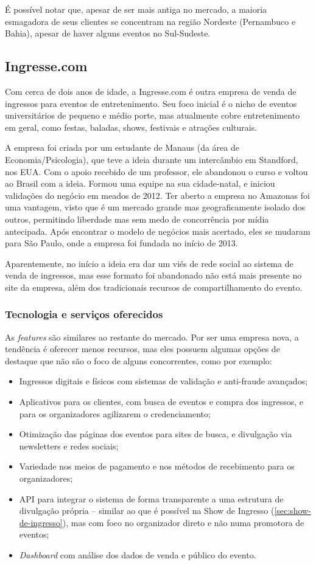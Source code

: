 \documentclass[12pt,a4paper,twoside,hyphens,english,brazil]{abntex2}
\begin{document}
É possível notar que, apesar de ser mais antiga no mercado, a maioria esmagadora de seus clientes se concentram na região Nordeste (Pernambuco e Bahia), apesar de haver alguns eventos no Sul-Sudeste.

\subsection{Ingresse.com}
Com cerca de dois anos de idade, a Ingresse.com é outra empresa de venda de ingressos para eventos de entretenimento. Seu foco inicial é o nicho de eventos universitários de pequeno e médio porte, mas atualmente cobre entretenimento em geral, como festas, baladas, shows, festivais e atrações culturais.

A empresa foi criada por um estudante de Manaus (da área de Economia/Psicologia), que teve a ideia durante um intercâmbio em Standford, nos EUA. Com o apoio recebido de um professor, ele abandonou o curso e voltou ao Brasil com a ideia. Formou uma equipe na sua cidade-natal, e iniciou validações do negócio em meados de 2012. Ter aberto a empresa no Amazonas foi uma vantagem, visto que é um mercado grande mas geograficamente isolado dos outros, permitindo liberdade mas sem medo de concorrência por mídia antecipada. Após encontrar o modelo de negócios mais acertado, eles se mudaram para São Paulo, onde a empresa foi fundada no início de 2013.\cite{ingresse-hypeness}\cite{ingresse-ig}

Aparentemente, no início a ideia era dar um viés de rede social ao sistema de venda de ingressos, mas esse formato foi abandonado não está mais presente no site da empresa, além dos tradicionais recursos de compartilhamento do evento.\cite{ingresse-ig}

\subsubsection*{Tecnologia e serviços oferecidos}
As \emph{features} são similares ao restante do mercado. Por ser uma empresa nova, a tendência é oferecer menos recursos, mas eles possuem algumas opções de destaque que não são o foco de alguns concorrentes, como por exemplo:
\begin{itemize}[itemsep=-1ex]
	\item Ingressos digitais e físicos com sistemas de validação e anti-fraude avançados;
	\item Aplicativos para os clientes, com busca de eventos e compra dos ingressos, e para os organizadores agilizarem o credenciamento;
	\item Otimização das páginas dos eventos para sites de busca, e divulgação via newsletters e redes sociais;
	\item Variedade nos meios de pagamento e nos métodos de recebimento para os organizadores;
	\item API para integrar o sistema de forma transparente a uma estrutura de divulgação própria -- similar ao que é possível na Show de Ingresso (\autoref{sec:show-de-ingresso}), mas com foco no organizador direto e não numa promotora de eventos;
	\item \emph{Dashboard} com análise dos dados de venda e público do evento.
\end{itemize}
\end{document}
